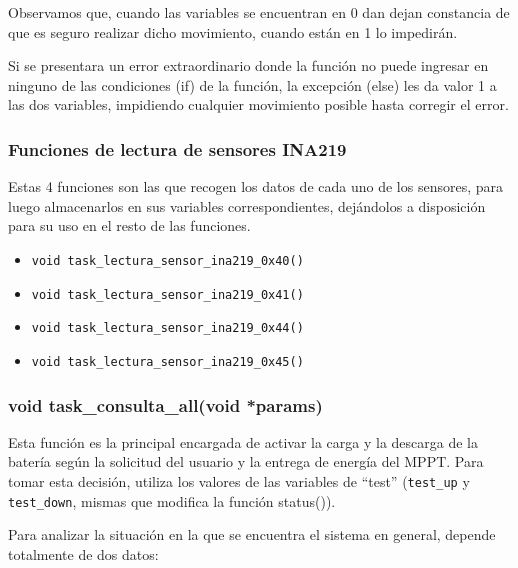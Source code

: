                     Observamos que, cuando las variables se encuentran en 0 dan dejan constancia de que es seguro realizar dicho movimiento, cuando están en 1 lo impedirán.\par
                    Si se presentara un error extraordinario donde la función no puede ingresar en ninguno de las condiciones (if) de la función, la excepción (else) les da valor 1 a las dos variables, impidiendo cualquier movimiento posible hasta corregir el error.\par

                \subsubsection{Funciones de lectura de sensores INA219}
                    Estas 4 funciones son las que recogen los datos de cada uno de los sensores, para luego almacenarlos en sus variables correspondientes, dejándolos a disposición para su uso en el resto de las funciones.\par
                    \begin{itemize} [label=•]
                        \setlength{\itemindent}{1.5em}
                        
                        \item \texttt{void task\_lectura\_sensor\_ina219\_0x40()}
                        \item \texttt{void task\_lectura\_sensor\_ina219\_0x41()}
                        \item \texttt{void task\_lectura\_sensor\_ina219\_0x44()}
                        \item \texttt{void task\_lectura\_sensor\_ina219\_0x45()}
                    \end{itemize}
                
                \subsubsection{void task\_consulta\_all(void *params)}
                    Esta función es la principal encargada de activar la carga y la descarga de la batería según la solicitud del usuario y la entrega de energía del MPPT. Para tomar esta decisión, utiliza los valores de las variables de “test” (\texttt{test\_up} y \texttt{test\_down}, mismas que modifica la función status()).\par
                    Para analizar la situación en la que se encuentra el sistema en general, depende totalmente de dos datos:\par
                    

